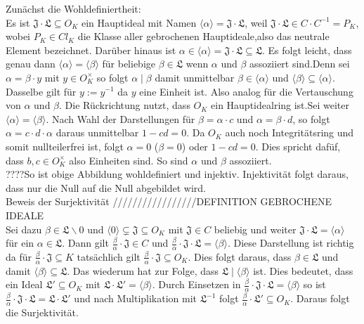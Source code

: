 \documentclass[10pt,a4paper]{article}
\begin{document}
Zunächst die Wohldefiniertheit:
\\
Es ist $\mathfrak{J\cdot L}\subseteq O_K$ ein Hauptideal mit Namen $\langle \alpha \rangle=\mathfrak{J\cdot L}$, weil $\mathfrak{J\cdot L} \in C\cdot C^{-1} = P_K$, wobei $P_K \in Cl_K$ die Klasse aller gebrochenen Hauptideale,also das neutrale Element bezeichnet. Darüber hinaus ist $\alpha \in \langle \alpha \rangle=\mathfrak{J\cdot L}\subseteq \mathfrak{L}$. Es folgt leicht, dass genau dann $\langle \alpha \rangle=\langle \beta \rangle$ für beliebige $\beta \in \mathfrak{L}$ wenn $\alpha$ und $\beta$ assoziiert sind.Denn sei $\alpha=\beta \cdot y$ mit $y \in O_K^{\times}$ so folgt $\alpha \mid \beta$ damit unmittelbar $\beta \in \langle \alpha \rangle$ und $\langle \beta \rangle  \subseteq \langle \alpha \rangle$. Dasselbe gilt für $y:= y^{-1}$ da $y$ eine Einheit ist. Also analog für die Vertauschung von $\alpha$ und $\beta$. Die Rückrichtung nutzt, dass $O_K$ ein Hauptidealring ist.Sei weiter $\langle \alpha \rangle=\langle \beta \rangle$. Nach Wahl der Darstellungen für $\beta=\alpha\cdot c$ und $\alpha=\beta\cdot d$, so folgt $\alpha=c\cdot d \cdot \alpha$ daraus unmittelbar $1-cd=0$. Da $O_K$ auch noch Integritätsring und somit nullteilerfrei ist, folgt $\alpha=0$  ($\beta =0$) oder $1-cd=0$. Dies spricht dafüf, dass $b,c \in O_K^{\times}$ also Einheiten sind. So sind $\alpha$ und $\beta$ assoziiert.
\\
????So ist obige Abbildung wohldefiniert und injektiv. Injektivität folgt daraus, dass nur die Null auf die Null abgebildet wird.
\\
Beweis der Surjektivität
/////////////////DEFINITION GEBROCHENE IDEALE
\\
Sei dazu $\beta \in \mathfrak{L}\backslash{0}$ und  $\langle 0 \rangle \subsetneq \mathfrak{J} \subseteq O_K$ mit $\mathfrak{J} \in C$ beliebig und weiter $\mathfrak{J\cdot L}= \langle \alpha \rangle$ für ein $\alpha \in \mathfrak{L}$. Dann gilt $\frac{\beta}{\alpha} \cdot \mathfrak{J} \in C$ und $\frac{\beta}{\alpha} \cdot \mathfrak{J\cdot L} = \langle \beta\rangle$. Diese Darstellung ist richtig da für $\frac{\beta}{\alpha} \cdot \mathfrak{J} \subseteq K$ tatsächlich gilt $\frac{\beta}{\alpha} \cdot \mathfrak{J} \subseteq O_K$. Dies folgt daraus, dass $\beta \in \mathfrak{L}$ und damit $\langle \beta \rangle \subseteq \mathfrak{L}$. Das wiederum hat zur Folge, dass $\mathfrak{L}\mid \langle \beta \rangle$ ist. Dies bedeutet, dass ein Ideal $\mathfrak{L'}\subseteq O_K$ mit $\mathfrak{L\cdot L'}= \langle \beta \rangle$. Durch Einsetzen in $\frac{\beta}{\alpha} \cdot \mathfrak{J\cdot L} = \langle \beta\rangle$ so ist $\frac{\beta}{\alpha} \cdot \mathfrak{J\cdot L} = \mathfrak{L \cdot L'} $ und nach Multiplikation mit $\mathfrak{L^{-1}}$ folgt $\frac{\beta}{\alpha} \cdot \mathfrak{L'}\subseteq O_K$. Daraus folgt die Surjektivität.
\end{document}
